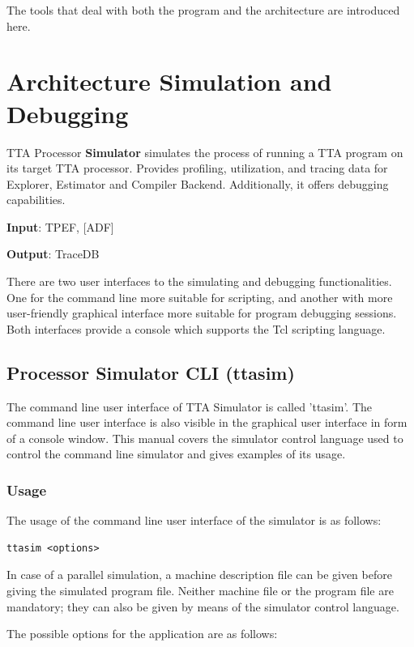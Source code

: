 \documentclass[twoside]{tceusermanual}
\begin{document}
The tools that deal with both the program and the architecture are
introduced here.


\section{Architecture Simulation and Debugging}

TTA Processor \textbf{Simulator} simulates the process of running a TTA
program on its target TTA processor. Provides profiling, utilization, and 
tracing data for Explorer, Estimator and Compiler Backend.  Additionally, 
it offers debugging capabilities. 

\textbf{Input}: TPEF, [ADF]

\textbf{Output}: TraceDB

There are two user interfaces to the simulating and debugging
functionalities. One for the command line more suitable for scripting, and
another with more user-friendly graphical interface more suitable for
program debugging sessions. Both interfaces provide a console which
supports the Tcl scripting language.

\subsection{Processor Simulator CLI (ttasim)}
\label{section:ttasim}

The command line user interface of TTA Simulator is called 'ttasim'. The command
line user interface is also visible in the graphical user interface in form of a
console window. This manual covers the simulator control language used to
control the command line simulator and gives examples of its usage.

\subsubsection{Usage}

The usage of the command line user interface of the simulator is as follows:

\begin{verbatim}
ttasim <options>
\end{verbatim}

In case of a parallel simulation, a machine description file can be given before
giving the simulated program file. Neither machine file or the program file are mandatory;
they can also be given by means of the simulator control language.

The possible options for the application are as follows:\\
\end{document}
